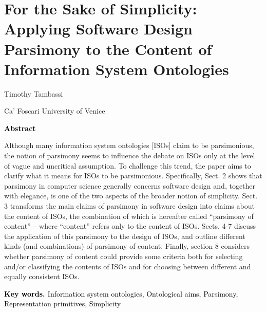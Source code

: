 \setcounter{secnumdepth}{0}


























\section{For the Sake of Simplicity: Applying Software Design Parsimony to the Content of Information System Ontologies}

Timothy Tambassi



Ca' Foscari University of Venice



\textbf{\textcolor{black}{Abstract}}



Although many information system ontologies [ISOs] claim to be parsimonious, the notion of parsimony\textcolor{red}{ }seems to influence the debate on ISOs only at the level of vague and uncritical assumption. To challenge this trend, the paper aims to clarify what it means for ISOs to be parsimonious. Specifically, Sect. 2 shows that parsimony in computer science generally concerns software design and, together with elegance, is one of the two aspects of the broader notion of simplicity. Sect. 3 transforms the main claims of parsimony in software design into claims about the content of ISOs, the combination of which is hereafter called ``parsimony of content'' -- where ``content'' refers only to the content of ISOs. Sects. 4-7 discuss the application of this parsimony to the design of ISOs, and outline different kinds (and combinations) of parsimony of content. Finally, section 8 considers whether parsimony of content could provide some criteria both for selecting and/or classifying the contents of ISOs and for choosing between different and equally consistent ISOs.



\textbf{\textcolor{black}{Key words. }}\textcolor{black}{Information system ontologies, Ontological aims, Parsimony, Representation primitives, Simplicity}



